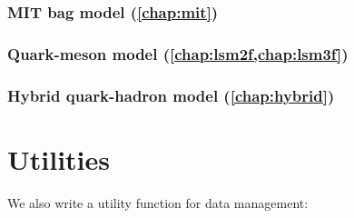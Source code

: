 \subsubsection{MIT bag model (\cref{chap:mit})}

\subsubsection{Quark-meson model (\cref{chap:lsm2f,chap:lsm3f})}

\subsubsection{Hybrid quark-hadron model (\cref{chap:hybrid})}

\section{Utilities}

We also write a utility function for data management:

